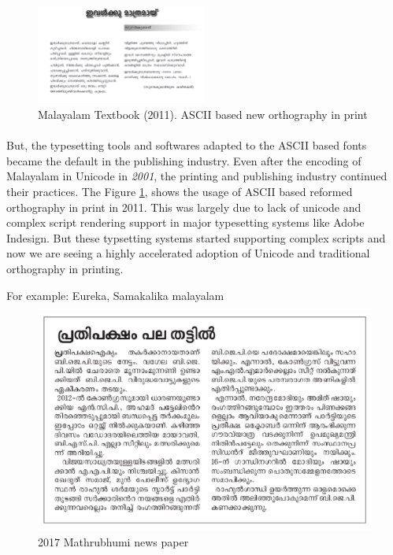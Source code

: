 \documentclass[10pt]{article}
\begin{document}
\begin{figure}
	\centering
	\includegraphics[width=0.5\textwidth]{images/2011-Malayalam-Textbook.png}
	\caption{Malayalam Textbook (2011). ASCII based new orthography in print}
	\label{textbook2011}
\end{figure}

\paragraph{}
But, the typesetting tools and softwares adapted to the ASCII based fonts became the default in the publishing industry. Even after the encoding of Malayalam in Unicode in \textit{2001}, the printing and publishing industry continued their practices. The Figure \ref{textbook2011}, shows the usage of ASCII based reformed orthography in print in 2011. This was largely due to lack of unicode and complex script rendering support in major typesetting systems like Adobe Indesign. But these typsetting systems started supporting complex scripts and now we are seeing a highly accelerated adoption of Unicode and traditional orthography in printing.

For example: Eureka, Samakalika malayalam


\begin{figure}[h!]
 \centering
  \includegraphics[width=1.0\textwidth]{images/2017-Mathrubhumi-newspaper.png}
   \caption{2017 Mathrubhumi news paper}
\end{figure}
\end{document}
